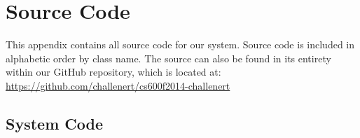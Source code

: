 %
%

\chapter{Source Code}\label{appb:code}


This appendix contains all source code for our system.  Source code is
included in alphabetic order by class name.  The source can also be found in
its entirety within our GitHub repository, which is located at:\\ \url{https://github.com/challenert/cs600f2014-challenert}

\section{System Code}\label{sec:cov}


















